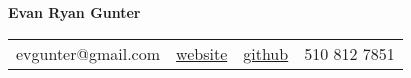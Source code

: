 \documentclass[12pt]{article}
\def\myh{20pt}
\let\oldbold\textbf
\renewcommand{\textbf}[1]{\oldbold{\color{boldpurple} #1}}
\begin{document}
\begin{center}
{\Large\textbf{\color{sidebar}Evan Ryan Gunter}}

\vspace{2pt}

\color{normaltext}
\pagecolor{backgroundcolor}

\newlength{\myhthree}
\setlength{\myhthree}{\myh*3}

\newlength\headerspace
\setlength\headerspace{0.3cm}
\begin{tabular}{cccc}
\hspace{-\myhthree}
\color{lavender}
evgunter@gmail.com \hspace{\headerspace} & \hspace{\headerspace} \href{https://evgunter.github.io}{website} \hspace{\headerspace} & \hspace{\headerspace} \href{https://github.com/evgunter}{github} \hspace{\headerspace} & \hspace{\headerspace} \color{lavender} 510 812 7851
\end{tabular}
\end{center}

\let\myhthree\relax

\vspace{3pt}

\thispagestyle{empty}

\newlength{\myhplus}
\setlength{\myhplus}{\myh-11pt}
\vspace{-\myhplus}
\let\myhplus\relax

\newlength{\rolesep}
\setlength{\rolesep}{6pt}
\end{document}
